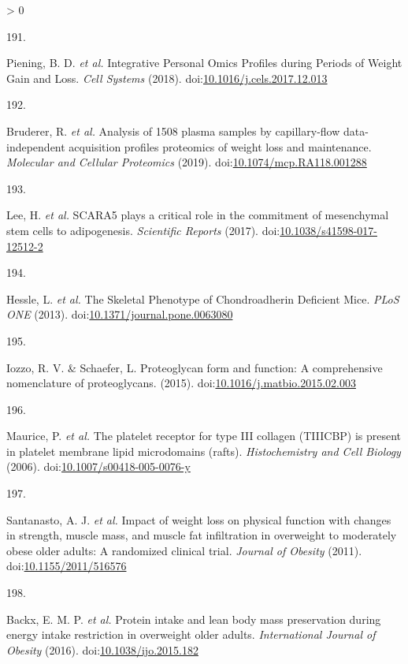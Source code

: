 \documentclass[11pt,twoside]{bristolthesis}
\newlength{\cslhangindent}
\newlength{\csllabelwidth}
\newenvironment{CSLReferences}[2] %
 {%
  \setlength{\parindent}{0pt}
  \ifodd #1 \everypar{\setlength{\hangindent}{\cslhangindent}}\ignorespaces\fi
  \ifnum #2 > 0
  \setlength{\parskip}{#2\baselineskip}
  \fi
 }%
 {}
\newcommand{\CSLLeftMargin}[1]{\parbox[t]{\csllabelwidth}{#1}}
\newcommand{\CSLRightInline}[1]{\parbox[t]{\linewidth - \csllabelwidth}{#1}\break}
\begin{document}
\begin{CSLReferences}{0}{0}
\leavevmode\hypertarget{ref-Piening2018}{}%
\CSLLeftMargin{191. }
\CSLRightInline{Piening, B. D. \emph{et al.} {Integrative Personal Omics Profiles during Periods of Weight Gain and Loss}. \emph{Cell Systems} (2018). doi:\href{https://doi.org/10.1016/j.cels.2017.12.013}{10.1016/j.cels.2017.12.013}}

\leavevmode\hypertarget{ref-Bruderer2019}{}%
\CSLLeftMargin{192. }
\CSLRightInline{Bruderer, R. \emph{et al.} {Analysis of 1508 plasma samples by capillary-flow data-independent acquisition profiles proteomics of weight loss and maintenance}. \emph{Molecular and Cellular Proteomics} (2019). doi:\href{https://doi.org/10.1074/mcp.RA118.001288}{10.1074/mcp.RA118.001288}}

\leavevmode\hypertarget{ref-Lee2017a}{}%
\CSLLeftMargin{193. }
\CSLRightInline{Lee, H. \emph{et al.} {SCARA5 plays a critical role in the commitment of mesenchymal stem cells to adipogenesis}. \emph{Scientific Reports} (2017). doi:\href{https://doi.org/10.1038/s41598-017-12512-2}{10.1038/s41598-017-12512-2}}

\leavevmode\hypertarget{ref-Hessle2013}{}%
\CSLLeftMargin{194. }
\CSLRightInline{Hessle, L. \emph{et al.} {The Skeletal Phenotype of Chondroadherin Deficient Mice}. \emph{PLoS ONE} (2013). doi:\href{https://doi.org/10.1371/journal.pone.0063080}{10.1371/journal.pone.0063080}}

\leavevmode\hypertarget{ref-Iozzo2015}{}%
\CSLLeftMargin{195. }
\CSLRightInline{Iozzo, R. V. \& Schaefer, L. {Proteoglycan form and function: A comprehensive nomenclature of proteoglycans}. (2015). doi:\href{https://doi.org/10.1016/j.matbio.2015.02.003}{10.1016/j.matbio.2015.02.003}}

\leavevmode\hypertarget{ref-Maurice2006}{}%
\CSLLeftMargin{196. }
\CSLRightInline{Maurice, P. \emph{et al.} {The platelet receptor for type III collagen (TIIICBP) is present in platelet membrane lipid microdomains (rafts)}. \emph{Histochemistry and Cell Biology} (2006). doi:\href{https://doi.org/10.1007/s00418-005-0076-y}{10.1007/s00418-005-0076-y}}

\leavevmode\hypertarget{ref-Santanasto2011}{}%
\CSLLeftMargin{197. }
\CSLRightInline{Santanasto, A. J. \emph{et al.} {Impact of weight loss on physical function with changes in strength, muscle mass, and muscle fat infiltration in overweight to moderately obese older adults: A randomized clinical trial}. \emph{Journal of Obesity} (2011). doi:\href{https://doi.org/10.1155/2011/516576}{10.1155/2011/516576}}

\leavevmode\hypertarget{ref-Backx2016}{}%
\CSLLeftMargin{198. }
\CSLRightInline{Backx, E. M. P. \emph{et al.} {Protein intake and lean body mass preservation during energy intake restriction in overweight older adults}. \emph{International Journal of Obesity} (2016). doi:\href{https://doi.org/10.1038/ijo.2015.182}{10.1038/ijo.2015.182}}


\end{CSLReferences}
\end{document}
